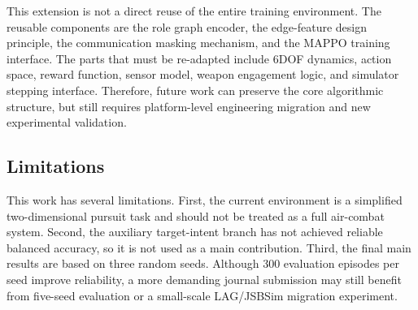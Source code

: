 This extension is not a direct reuse of the entire training environment. The reusable components are the role graph encoder, the edge-feature design principle, the communication masking mechanism, and the MAPPO training interface. The parts that must be re-adapted include 6DOF dynamics, action space, reward function, sensor model, weapon engagement logic, and simulator stepping interface. Therefore, future work can preserve the core algorithmic structure, but still requires platform-level engineering migration and new experimental validation.

\subsection{Limitations}

This work has several limitations. First, the current environment is a simplified two-dimensional pursuit task and should not be treated as a full air-combat system. Second, the auxiliary target-intent branch has not achieved reliable balanced accuracy, so it is not used as a main contribution. Third, the final main results are based on three random seeds. Although 300 evaluation episodes per seed improve reliability, a more demanding journal submission may still benefit from five-seed evaluation or a small-scale LAG/JSBSim migration experiment.
